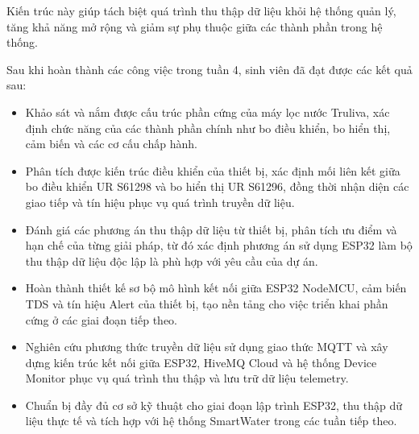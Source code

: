 Kiến trúc này giúp tách biệt quá trình thu thập dữ liệu khỏi hệ thống quản lý, tăng khả năng mở rộng và giảm sự phụ thuộc giữa các thành phần trong hệ thống.


Sau khi hoàn thành các công việc trong tuần 4, sinh viên đã đạt được các kết quả sau:

\begin{itemize}
    \item Khảo sát và nắm được cấu trúc phần cứng của máy lọc nước Truliva, xác định chức năng của các thành phần chính như bo điều khiển, bo hiển thị, cảm biến và các cơ cấu chấp hành.

    \item Phân tích được kiến trúc điều khiển của thiết bị, xác định mối liên kết giữa bo điều khiển UR S61298 và bo hiển thị UR S61296, đồng thời nhận diện các giao tiếp và tín hiệu phục vụ quá trình truyền dữ liệu.

    \item Đánh giá các phương án thu thập dữ liệu từ thiết bị, phân tích ưu điểm và hạn chế của từng giải pháp, từ đó xác định phương án sử dụng ESP32 làm bộ thu thập dữ liệu độc lập là phù hợp với yêu cầu của dự án.

    \item Hoàn thành thiết kế sơ bộ mô hình kết nối giữa ESP32 NodeMCU, cảm biến TDS và tín hiệu Alert của thiết bị, tạo nền tảng cho việc triển khai phần cứng ở các giai đoạn tiếp theo.

    \item Nghiên cứu phương thức truyền dữ liệu sử dụng giao thức MQTT và xây dựng kiến trúc kết nối giữa ESP32, HiveMQ Cloud và hệ thống Device Monitor phục vụ quá trình thu thập và lưu trữ dữ liệu telemetry.

    \item Chuẩn bị đầy đủ cơ sở kỹ thuật cho giai đoạn lập trình ESP32, thu thập dữ liệu thực tế và tích hợp với hệ thống SmartWater trong các tuần tiếp theo.
\end{itemize}
